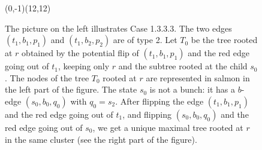 \documentclass[11pt,a4paper]{article}
\def\T{{T}}
\begin{document}
\begin{itemize}
\begin{figure}[htbp]
{\begin{VCPicture}{(0,-1)(12,12)}
{
}
\end{VCPicture}}
        \caption{ The picture on the left illustrates Case 1.3.3.3. The
          two edges $(t_1,b_1,p_1)$ and $(t_1,b_2,p_2)$ are of type 2.
          Let $\T_0$ be the tree rooted at $r$ obtained by the
          potential flip of $(t_1,b_1,p_1)$ and the red edge going out
          of $t_1$, keeping only $r$ and the subtree rooted at the
          child $s_0$. The nodes of the tree $\T_0$ rooted at $r$ are
          represented in salmon in the left part of the figure.  The
          state $s_0$ is not a bunch: it has a $b$-edge
          $(s_0,b_0,q_0)$ with $q_0=s_2$. After flipping the edge
          $(t_1,b_1,p_1)$ and the red edge going out of $t_1$, and
          flipping $(s_0,b_0,q_0)$ and the red edge going out of
          $s_0$, we get a unique maximal tree rooted at $r$ in the
          same cluster (see the right part of the figure). }
\label{figure.cluster5}
\end{figure}


\end{itemize}
\end{document}
